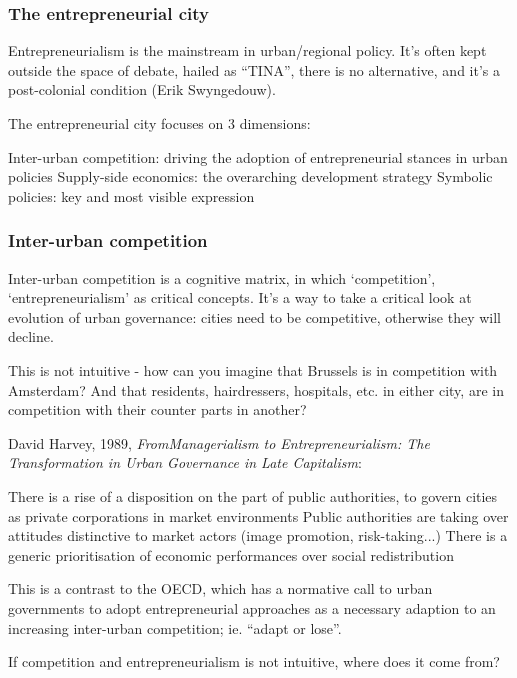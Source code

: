 \documentclass{article}
\begin{document}
\subsubsection{The entrepreneurial city}

Entrepreneurialism is the mainstream in urban/regional policy. It's often kept outside the space of debate, hailed as ``TINA'',  there is no alternative, and it's a post-colonial condition (Erik Swyngedouw).

The entrepreneurial city focuses on 3 dimensions:
\begin{outline}
	\1 Inter-urban competition: driving the adoption of entrepreneurial stances in urban policies
	\1 Supply-side economics: the overarching development strategy
	\1 Symbolic policies: key and most visible expression 
\end{outline}

\subsubsection{Inter-urban competition}

Inter-urban competition is a cognitive matrix, in which `competition', `entrepreneurialism' as critical concepts. It's a way to take a critical look at evolution of urban governance: cities need to be competitive, otherwise they will decline.

This is not intuitive - how can you imagine that Brussels is in competition with Amsterdam? And that residents, hairdressers, hospitals, etc. in either city, are in competition with their counter parts in another?

David Harvey, 1989, \textit{FromManagerialism to Entrepreneurialism: The Transformation in Urban Governance in Late Capitalism}:

\begin{outline}
	\1 There is a rise of a disposition on the part of public authorities, to govern cities as private corporations in market environments
	\1 Public authorities are taking over attitudes distinctive to market actors (image promotion, risk-taking...)
	\1 There is a generic prioritisation of economic performances over social redistribution
\end{outline}

This is a contrast to the OECD, which has a normative call to urban governments to adopt entrepreneurial approaches as a necessary adaption to an increasing inter-urban competition; ie. ``adapt or lose''.

If competition and entrepreneurialism is not intuitive, where does it come from? 
\end{document}

